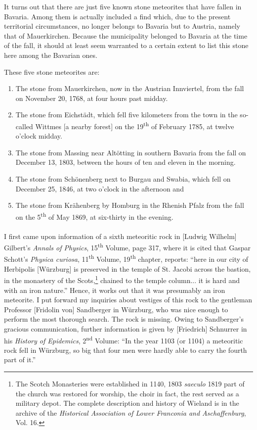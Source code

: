 \documentclass[a4paper, 12pt, oneside]{article}
\begin{document}
It turns out that there are just five known stone meteorites that have fallen in Bavaria. Among them is actually included a find which, due to the present territorial circumstances, no longer belongs to Bavaria but to Austria, namely that of Mauerkirchen. Because the municipality belonged to Bavaria at the time of the fall, it should at least seem warranted to a certain extent to list this stone here among the Bavarian ones.

These five stone meteorites are:
\begin{enumerate}
    \item The stone from Mauerkirchen, now in the Austrian Innviertel, from the fall on November 20, 1768, at four hours past midday.
    \item The stone from Eichstädt, which fell five kilometers from the town in the so-called Wittmes [a nearby forest] on the 19\textsuperscript{th} of February 1785, at twelve o'clock midday.
    \item The stone from Massing near Altötting in southern Bavaria from the fall on December 13, 1803, between the hours of ten and eleven in the morning.
    \item The stone from Schönenberg next to Burgau and Swabia, which fell on December 25, 1846, at two o'clock in the afternoon and
    \item The stone from Krähenberg by Homburg in the Rhenish Pfalz from the fall on the 5\textsuperscript{th} of May 1869, at six-thirty in the evening.
\end{enumerate}
\paragraph*{}
I first came upon information of a sixth meteoritic rock in [Ludwig Wilhelm] Gilbert's \emph{Annals of Physics}, 15\textsuperscript{th} Volume, page 317, where it is cited that Gaspar Schott's \emph{Physica curiosa}, 11\textsuperscript{th} Volume, 19\textsuperscript{th} chapter, reports: ``here in our city of Herbipolis [Würzburg] is preserved in the temple of St. Jacobi across the bastion, in the monastery of the Scots,\footnote{The Scotch Monasteries were established in 1140, 1803 \emph{saeculo} 1819 part of the church was restored for worship, the choir in fact, the rest served as a military depot. The complete description and history of Wieland is in the archive of the \emph{Historical Association of Lower Franconia and Aschaffenburg}, Vol. 16.} chained to the temple column... it is hard and with an iron nature.'' Hence, it works out that it was presumably an iron meteorite. I put forward my inquiries about vestiges of this rock to the gentleman Professor [Fridolin von] Sandberger in Würzburg, who was nice enough to perform the most thorough search. The rock is missing. Owing to Sandberger's gracious communication, further information is given by [Friedrich] Schnurrer in his \emph{History of Epidemics}, 2\textsuperscript{nd} Volume: ``In the year 1103 (or 1104) a meteoritic rock fell in Würzburg, so big that four men were hardly able to carry the fourth part of it.''
\clearpage
\end{document}
